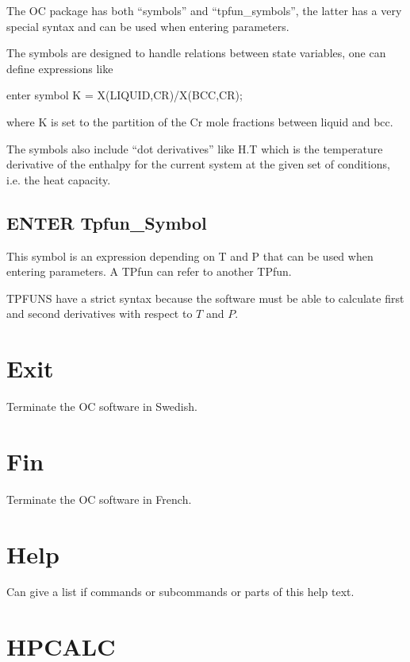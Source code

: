 \documentclass[12pt]{article}
\begin{document}
The OC package has both ``symbols'' and ``tpfun\_symbols'', the latter
has a very special syntax and can be used when entering parameters.

The symbols are designed to handle relations between state variables,
one can define expressions like 

enter symbol K = X(LIQUID,CR)/X(BCC,CR);

where K is set to the partition of the Cr mole fractions between
liquid and bcc.

The symbols also include ``dot derivatives'' like H.T which is the
temperature derivative of the enthalpy for the current system at the
given set of conditions, i.e. the heat capacity.

\subsection{ENTER Tpfun\_Symbol}

This symbol is an expression depending on T and P that can be used
when entering parameters.  A TPfun can refer to another TPfun.

TPFUNS have a strict syntax because the software must be able to
calculate first and second derivatives with respect to $T$ and $P$.

\section{Exit}

Terminate the OC software in Swedish.

\section{Fin }

Terminate the OC software in French.

\section{Help }

Can give a list if commands or subcommands or parts of this help text.

\section{HPCALC }
\end{document}
